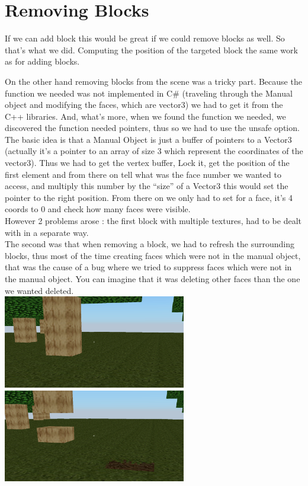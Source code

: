 \documentclass[article]{report}             %
\begin{document}
				
				
			\section{Removing Blocks}
				If we can add block this would be great if we could remove blocks as well. So that's what we did. Computing the position of the targeted block the same work as for adding blocks.

				On the other hand removing blocks from the scene was a tricky part. Because the function we needed was not implemented in C\# (traveling through the Manual object and modifying the faces, which are vector3) we had to get it from the C++ libraries. And, what's more, when we found the function we needed, we discovered the function needed pointers, thus so we had to use the unsafe option.\\

				The basic idea is that a Manual Object is just a buffer of pointers to a Vector3 (actually it's a pointer to an array of size 3 which represent the coordinates of the vector3). Thus we had to get the vertex buffer, Lock it, get the position of the first element and from there on tell what was the face number we wanted to access, and multiply this number by the \enquote{size} of a Vector3 this would set the pointer to the right position. From there on we only had to set for a face, it's 4 coords to 0 and check how many faces were visible.\\

				However 2 problems arose : the first block with multiple textures, had to be dealt with in a separate way. \\
				The second was that when removing a block, we had to refresh the surrounding blocks, thus most of the time creating faces which were not in the manual object, that was the cause of a bug where we tried to suppress faces which were not in the manual object. You can imagine that it was deleting other faces than the one we wanted deleted.\\

				\includegraphics[width = 8cm]{images/Graphics/before.png}		
				\includegraphics[width = 8cm]{images/Graphics/after.png} \\
\end{document}
